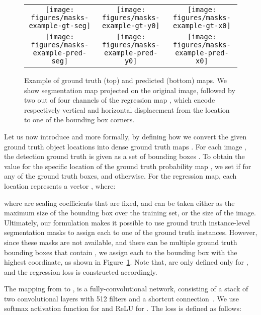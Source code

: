 \documentclass[10pt,twocolumn,letterpaper]{article}
\begin{document}
\begin{figure}
\begin{center}
\begin{tabular}{ccc}
\texttt{[image: figures/masks-example-gt-seg]} &
\texttt{[image: figures/masks-example-gt-y0]} &
\texttt{[image: figures/masks-example-gt-x0]} \\
\texttt{[image: figures/masks-example-pred-seg]} &
\texttt{[image: figures/masks-example-pred-y0]} &
\texttt{[image: figures/masks-example-pred-x0]} \\
\end{tabular}
\end{center}
\vspace{-0.25cm}
\caption{Example of ground truth (top) and predicted (bottom) maps. We show
  segmentation map  projected on the original image, followed by two out of four
  channels of the regression map , which encode respectively vertical and horizontal displacement from the location  to one of the bounding box corners.}
\label{fi:method:dense-maps}
\vspace{-0.5cm}
\end{figure}

Let us now introduce  and  more formally, by defining how we convert
the given ground truth object locations into dense ground truth maps
. For each image , the detection ground truth is 
given as a set of bounding boxes
. To obtain the
value for the specific location  of the ground truth
probability map , we set  if 
 for any of the ground truth boxes,
and  otherwise. 
For the regression map, each location  represents a vector 
, where:


where  are scaling coefficients that are fixed, and can be taken
either as the maximum size of the bounding box over the training set, or the
size of the image. Ultimately, our formulation makes it possible to use
ground truth instance-level segmentation masks to assign each  to one of the ground
truth instances. However, since these masks  are not available, and there 
can be multiple ground truth bounding boxes that contain , we
assign each  to the bounding box with the highest  coordinate, 
as shown in Figure~\ref{fi:method:dense-maps}. Note that,  are only
defined only for , and the regression loss is constructed 
accordingly.

The mapping from  to ,  is a fully-convolutional network,
consisting of a stack of two  convolutional layers with 512 filters 
and a shortcut connection~\cite{He2016}. We use softmax activation function for
 and ReLU for . The loss is defined as follows:
\end{document}
